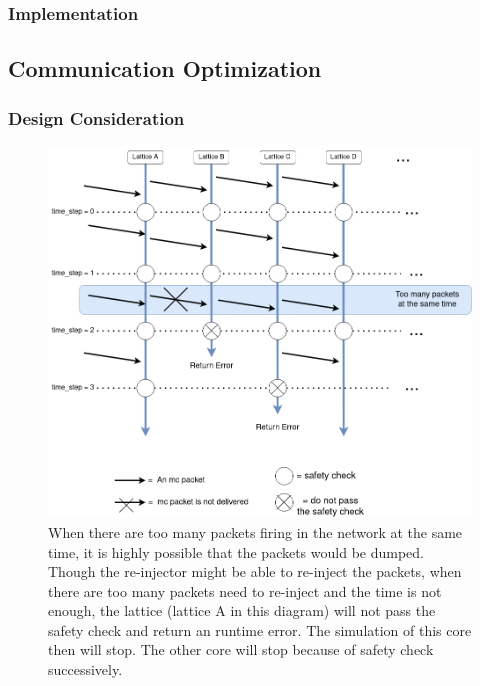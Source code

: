\subsubsection{Implementation}

\subsection{Communication Optimization}
\subsubsection{Design Consideration}
\begin{figure}[tb]
   \centering
       \includegraphics[width=1\textwidth]{figures/packet_error.png}
       \caption{When there are too many packets firing in the network at the same time, it is highly possible that the packets would be dumped. Though the re-injector might be able to re-inject the packets, when there are too many packets need to re-inject and the time is not enough, the lattice (lattice A in this diagram) will not pass the safety check and return an runtime error. The simulation of this core then will stop. The other core will stop because of safety check successively.}
       \label{fig:packet_error}
\end{figure}
